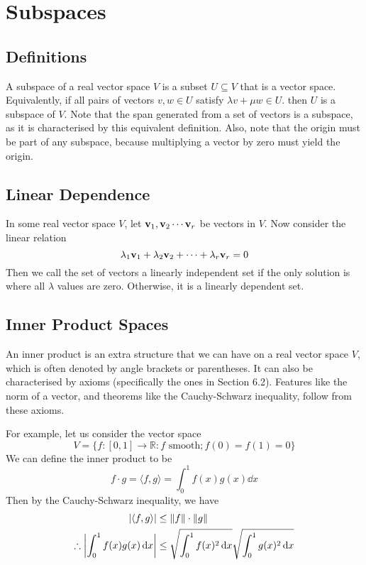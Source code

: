 \documentclass{article}
\begin{document}
\section{Subspaces}
\subsection{Definitions}
A subspace of a real vector space $V$ is a subset $U \subseteq V$ that is a vector space. Equivalently, if all pairs of vectors $v, w \in U$ satisfy $\lambda v + \mu w \in U$. then $U$ is a subspace of $V$. Note that the span generated from a set of vectors is a subspace, as it is characterised by this equivalent definition. Also, note that the origin must be part of any subspace, because multiplying a vector by zero must yield the origin.

\subsection{Linear Dependence}
In some real vector space $V$, let $\vb v_1, \vb v_2 \cdots \vb v_r$ be vectors in $V$. Now consider the linear relation
\[ \lambda_1 \vb v_1 + \lambda_2 \vb v_2 + \cdots + \lambda_r \vb v_r = 0 \]
Then we call the set of vectors a linearly independent set if the only solution is where all $\lambda$ values are zero. Otherwise, it is a linearly dependent set.

\subsection{Inner Product Spaces}
An inner product is an extra structure that we can have on a real vector space $V$, which is often denoted by angle brackets or parentheses. It can also be characterised by axioms (specifically the ones in Section 6.2). Features like the norm of a vector, and theorems like the Cauchy-Schwarz inequality, follow from these axioms.

For example, let us consider the vector space
\[ V = \{ f: [0, 1] \to \mathbb R: f \text{ smooth}; f(0) = f(1) = 0 \} \]
We can define the inner product to be
\[ f \cdot g = \langle f, g \rangle = \int_0^1 f(x)g(x)\dd{x} \]
Then by the Cauchy-Schwarz inequality, we have
\begin{align*}
	\abs{\langle f, g \rangle}               & \leq \norm{f} \cdot \norm{g}                                    \\
	\therefore \abs{\int_0^1 f(x)g(x)\dd{x}} & \leq \sqrt{\int_0^1 f(x)^2 \dd{x}}\sqrt{\int_0^1 g(x)^2 \dd{x}}
\end{align*}
\end{document}
